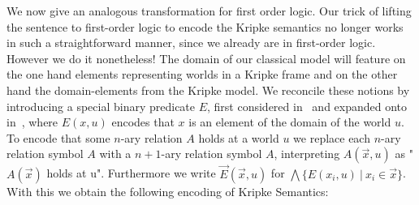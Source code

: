 \documentclass[runningheads]{llncs}
\begin{document}
We now give an analogous transformation for first order logic. Our trick of lifting the sentence to first-order logic to encode the Kripke semantics no longer works in such a straightforward manner, since we already are in first-order logic. However we do it nonetheless! The domain of our classical model will feature on the one hand elements representing worlds in a Kripke frame and on the other hand the domain-elements from the Kripke model. We reconcile these notions by introducing a special binary predicate $E$, first considered in~\cite{baaz2006skolemization} and expanded onto in~\cite{iemhoff2010eskolemization}, where $E(x, u)$ encodes that $x$ is an element of the domain of the world $u$. To encode that some $n$-ary relation $A$ holds at a world $u$ we replace each $n$-ary relation symbol $A$ with a $n+1$-ary relation symbol $A$, interpreting $A(\vec x, u)$ as "$A(\vec x)$ holds at u". Furthermore we write $\vec E(\vec x, u)$ for $\bigwedge\{E(x_i, u)\:|\:x_i\in \vec x\}$. With this we obtain the following encoding of Kripke Semantics:
\end{document}
